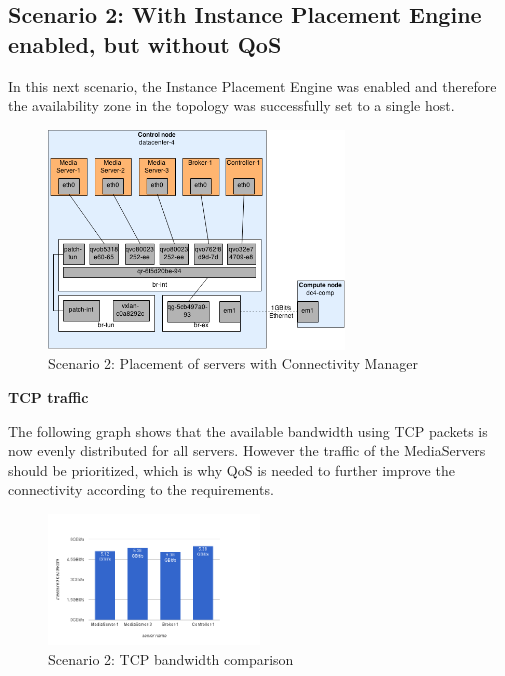 \subsection{Scenario 2: With Instance Placement Engine enabled, but without QoS}

In this next scenario, the Instance Placement Engine was enabled and therefore the availability zone in the topology was successfully set to a single host.

\begin{figure}[H]
\centering

\includegraphics[width=0.7\textwidth]{images/evaluation/testbed_scenario2}

\caption{Scenario 2: Placement of servers with Connectivity Manager}
\end{figure}

\textbf{TCP traffic}

The following graph shows that the available bandwidth using TCP packets is now evenly distributed for all servers. However the traffic of the MediaServers should be prioritized, which is why QoS is needed to further improve the connectivity according to the requirements.

\begin{figure}[H]
\centering

\includegraphics[width=0.5\textwidth]{images/evaluation/testbed_scenario2_bw}

\caption{Scenario 2: TCP bandwidth comparison}
\end{figure}

